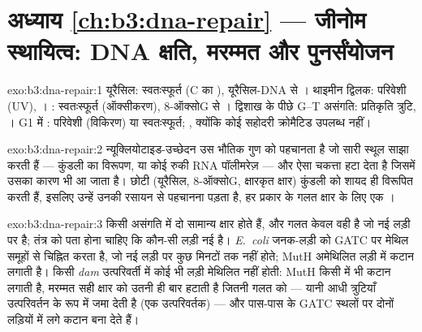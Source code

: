 \section*{अध्याय \ref{ch:b3:dna-repair} --- जीनोम स्थायित्व: DNA क्षति, मरम्मत और पुनर्संयोजन}

\begin{solution}{exo:b3:dna-repair:1}
यूरैसिल: स्वतःस्फूर्त (C का ), यूरैसिल-DNA  से
। थाइमीन द्विलक: परिवेशी (UV),
। : स्वतःस्फूर्त
(ऑक्सीकरण), 8-ऑक्सोG  से । द्विशाख के
पीछे G--T असंगति: प्रतिकृति त्रुटि, । G1 में : परिवेशी (विकिरण) या स्वतःस्फूर्त; , क्योंकि
कोई सहोदरी क्रोमैटिड उपलब्ध नहीं।
\end{solution}

\begin{solution}{exo:b3:dna-repair:2}
न्यूक्लियोटाइड-उच्छेदन उस भौतिक गुण को पहचानता है जो सारी स्थूल
 साझा करती हैं --- कुंडली का विरूपण, या कोई रुकी RNA
पॉलीमरेज़ --- और ऐसा चकत्ता हटा देता है जिसमें उसका कारण भी आ जाता है।
छोटी  (यूरैसिल, 8-ऑक्सोG, क्षारकृत क्षार) कुंडली को शायद ही
विरूपित करती हैं, इसलिए उन्हें उनकी रसायन से पहचानना पड़ता है, हर
प्रकार के गलत क्षार के लिए एक ।
\end{solution}

\begin{solution}{exo:b3:dna-repair:3}
किसी असंगति में दो सामान्य क्षार होते हैं, और गलत केवल वही है जो नई
लड़ी पर है; तंत्र को पता होना चाहिए कि कौन-सी लड़ी नई है।
\emph{E.~coli} जनक-लड़ी को GATC पर मेथिल समूहों से चिह्नित करता है,
जो नई लड़ी पर कुछ मिनटों तक नहीं होते; MutH अमेथिलित लड़ी में कटान
लगाती है। किसी \emph{dam} उत्परिवर्ती में कोई भी लड़ी मेथिलित नहीं
होती: MutH किसी में भी कटान लगाती है, मरम्मत सही क्षार को उतनी ही बार
हटाती है जितनी गलत को --- यानी आधी त्रुटियाँ उत्परिवर्तन के रूप में
जमा देती है (एक उत्परिवर्तक) --- और पास-पास के GATC स्थलों पर दोनों
लड़ियों में लगे कटान  बना देते हैं।
\end{solution}

